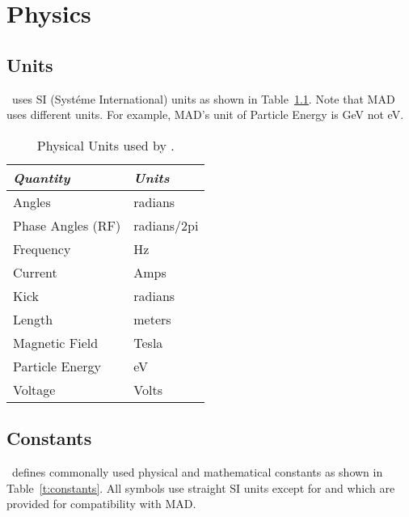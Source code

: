 \chapter{Physics}

\section{Units}

\bmad\ uses SI (Syst\'eme International) units as shown in
Table~\ref{t:units}.  Note that MAD uses different units. For example,
MAD's unit of Particle Energy is GeV not eV.
\begin{table}[h]
\centering
\begin{tabular}{|l|l|} \hline
  {\em Quantity}     & {\em Units}     \\ \hline
  Angles             &    radians      \\ 
  Phase Angles (RF)  &    radians/2pi  \\ 
  Frequency          &    Hz           \\ 
  Current            &    Amps         \\ 
  Kick               &    radians      \\ 
  Length             &    meters       \\ 
  Magnetic Field     &    Tesla        \\ 
  Particle Energy    &    eV           \\ 
  Voltage            &    Volts        \\ \hline
\end{tabular}
\caption{Physical Units used by \bmad.}
\label{t:units}
\end{table}


\section{Constants}

\bmad\ defines commonally used physical and mathematical constants as
shown in Table~\ref{t:constants}.  All symbols use straight SI units
except for  and  which are provided for
compatibility with MAD.

